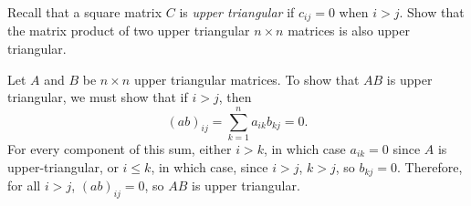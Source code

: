\documentclass{ximera}
\begin{document}
\begin{exercise} \label{c4.7.8}
Recall that a square matrix $C$ is {\em upper triangular\/} if $c_{ij}=0$
when $i>j$.  Show that the matrix product of two upper triangular $n\times n$
matrices is also upper triangular.

\begin{solution}

Let $A$ and $B$ be $n \times n$ upper triangular matrices.  To show
that $AB$ is upper triangular, we must show that if $i > j$, then
\[ (ab)_{ij} = \sum_{k = 1}^{n} a_{ik}b_{kj} = 0. \]
For every component of this sum, either $i > k$, in which case $a_{ik}
= 0$ since $A$ is upper-triangular, or $i \leq k$, in which case, since
$i > j$, $k > j$, so $b_{kj} = 0$.  Therefore, for all $i > j$,
$(ab)_{ij} = 0$, so $AB$ is upper triangular.


\end{solution}
\end{exercise}
\end{document}
